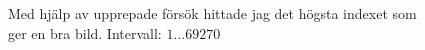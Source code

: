 \documentclass[a4paper]{article}
\begin{document}
\begin{figure}[H]
  \caption{Med hjälp av upprepade försök hittade jag det högsta indexet som ger en bra bild. Intervall: $1\ldots69270$}
  \begin{centering}
    \setlength\fboxsep{0pt}
    \setlength\fboxrule{0.5pt}

\end{centering}
\end{figure}
\end{document}
